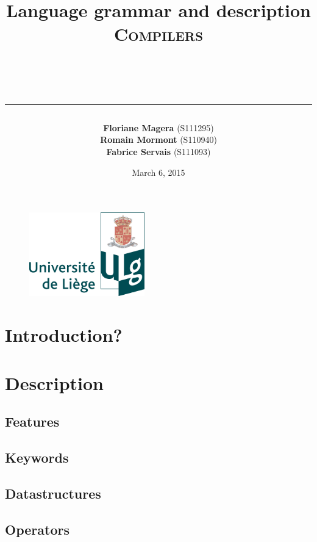 \documentclass[a4paper,titlepage]{article}
\begin{document}
\begin{titlepage}

\begin{figure}
\centering
\includegraphics[width=5cm]{logo-ulg.png}
\end{figure}



\title{
\vspace{0.2cm}
\LARGE{\textbf{Language grammar and description}} \\ \textsc{Compilers}
\author{\textbf{Floriane Magera} \small{(S111295})\\\textbf{Romain Mormont} \small{(S110940})\\\textbf{Fabrice Servais} \small{(S111093})}\\
\date{March 6, 2015}
\rule{15cm}{1.5pt}
}

\end{titlepage}

\pagestyle{fancy}

\maketitle
  
\section{Introduction?}



\section{Description}


  \subsection{Features}



  \subsection{Keywords}



  \subsection{Datastructures}




  \subsection{Operators}



\newpage
\end{document}

